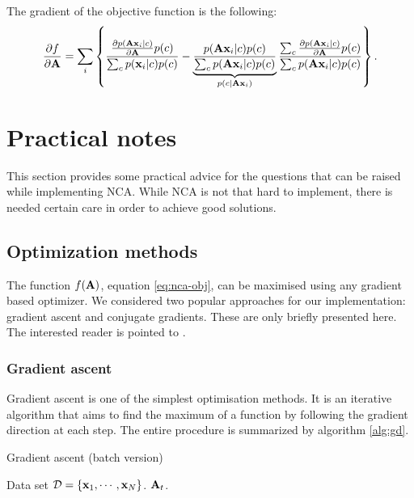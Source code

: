 	The gradient of the objective function is the following:
	\begin{align}
	    \frac{\partial f}{\partial \mathbf{A}} =
	      \sum_i \left\{
	                \frac
	                {
	                    \frac{\partial p(\mathbf{A}\mathbf{x}_i|c)}{\partial \mathbf{A}}p(c)
	                }
	                {
	                    \sum_c p(\mathbf{x}_i|c)p(c)
	                }
	                - \underbrace{\frac{
	                    p(\mathbf{A}\mathbf{x}_i|c)p(c)
	                }{
	                    \sum_c p(\mathbf{A}\mathbf{x}_i|c)p(c)
	                }}_{p(c|\mathbf{A}\mathbf{x}_i)}
	                \frac{
	                    \sum_c \frac{\partial p(\mathbf{A}\mathbf{x}_i|c)}{\partial \mathbf{A}}p(c)
	                }{
	                    \sum_c p(\mathbf{A}\mathbf{x}_i|c)p(c)
	                }
	             \right \}.
	    \label{eq:nca-cc-kde-grad}
	\end{align}
	

\section{Practical notes}
\label{sec:practical-notes}

	This section provides some practical advice for the questions 
	that can be raised while implementing NCA. 
	While NCA is not that hard to implement, there is needed certain care
	in order to achieve good solutions.

\subsection{Optimization methods}
\label{subsec:optimization}

	The function $f(\mathbf{A})$, equation \ref{eq:nca-obj}, can be maximised using any gradient based optimizer. We considered two popular approaches for our implementation: gradient ascent and conjugate gradients. These are only briefly presented here. The interested reader is pointed to \citet{bishop1995}.

	\subsubsection*{Gradient ascent}

	Gradient ascent is one of the simplest optimisation methods. It is an iterative algorithm that aims to find the maximum of a function by following the gradient direction at each step. The entire procedure is summarized by algorithm \ref{alg:gd}.
      
	\begin{algorithm} 
		\caption{Gradient ascent (batch version)} 
		\label{alg:gd}  
		\begin{algorithmic}[1]                    %
			\REQUIRE Data set $\mathcal{D}=\{\mathbf{x}_1,\cdots,\mathbf{x}_N\}$.
			 \label{alg:gd-init}
			\REPEAT
			\RETURN $\mathbf{A}_{t}$.
		\end{algorithmic}
	\end{algorithm}

